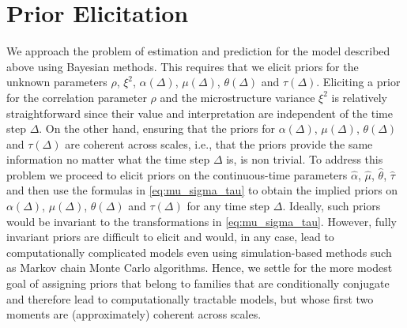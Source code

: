 \documentclass[10pt]{article}
\begin{document}
\section{Prior Elicitation}\label{se:prior_elicitation}

We approach the problem of estimation and prediction for the model described above using Bayesian methods. This requires that we elicit priors for the unknown parameters $\rho$, $\xi^2$, $\alpha(\Delta)$, $\mu(\Delta)$, $\theta(\Delta)$ and $\tau(\Delta)$.  Eliciting a prior for the correlation parameter $\rho$ and the microstructure variance $\xi^2$ is relatively straightforward since their value and interpretation are independent of the time step $\Delta$.  On the other hand, ensuring that the priors for $\alpha(\Delta)$, $\mu(\Delta)$, $\theta(\Delta)$ and $\tau(\Delta)$ are coherent across scales, i.e., that the priors provide the same information no matter what the time step $\Delta$ is, is non trivial.  To address this problem we proceed to elicit priors on the continuous-time parameters $\hat{\alpha}$, $\hat{\mu}$, $\hat{\theta}$, $\hat{\tau}$ and then use the formulas in \eqref{eq:mu_sigma_tau} to obtain the implied priors on $\alpha(\Delta)$, $\mu(\Delta)$, $\theta(\Delta)$ and $\tau(\Delta)$ for any time step $\Delta$.  Ideally, such priors would be invariant to the transformations in \eqref{eq:mu_sigma_tau}.  However, fully invariant priors are difficult to elicit and would, in any case, lead to computationally complicated models even using simulation-based methods such as Markov chain Monte Carlo algorithms.  Hence, we settle for the more modest goal of assigning priors that belong to families that are conditionally conjugate and therefore lead to computationally tractable models, but whose first two moments are (approximately) coherent across scales.
\end{document}
